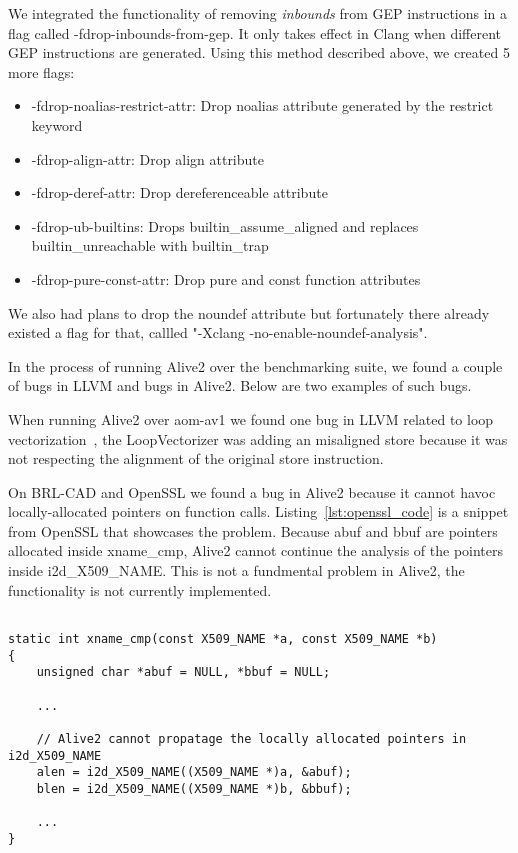 We integrated the functionality of removing \textit{inbounds} from GEP
instructions in a flag called -fdrop-inbounds-from-gep. It only takes effect in
Clang when different GEP instructions are generated. Using this method described
above, we created 5 more flags:

\begin{itemize}
  \item -fdrop-noalias-restrict-attr: Drop noalias attribute generated by the
restrict keyword
  \item -fdrop-align-attr: Drop align attribute
  \item -fdrop-deref-attr: Drop dereferenceable attribute
  \item -fdrop-ub-builtins: Drops builtin_assume_aligned and replaces builtin_unreachable with builtin_trap
  \item -fdrop-pure-const-attr: Drop pure and const function attributes
\end{itemize}

We also had plans to drop the noundef attribute but fortunately there already
existed a flag for that, callled "-Xclang -no-enable-noundef-analysis".

In the process of running Alive2 over the benchmarking suite, we found a couple
of bugs in LLVM and bugs in Alive2. Below are two examples of such bugs.

When running Alive2 over aom-av1 we found one bug in LLVM related to loop
vectorization~\cite{loopvectbug}, the LoopVectorizer was adding an misaligned
store because it was not respecting the alignment of the original store
instruction.

On BRL-CAD and OpenSSL we found a bug in Alive2 because it cannot havoc
locally-allocated pointers on function calls. Listing~\ref{lst:openssl_code} is
a snippet from OpenSSL that showcases the problem. Because abuf and bbuf are
pointers allocated inside xname_cmp, Alive2 cannot continue the analysis of the
pointers inside i2d_X509_NAME. This is not a fundmental problem in Alive2, the
functionality is not currently implemented.

\begin{lstlisting}[style=Cstyle, caption={OpenSSL code that was causing Alive2 bug}, label={lst:openssl_code}]

static int xname_cmp(const X509_NAME *a, const X509_NAME *b)
{
    unsigned char *abuf = NULL, *bbuf = NULL;

    ...

    // Alive2 cannot propatage the locally allocated pointers in i2d_X509_NAME
    alen = i2d_X509_NAME((X509_NAME *)a, &abuf);
    blen = i2d_X509_NAME((X509_NAME *)b, &bbuf);

    ...
}

\end{lstlisting}
